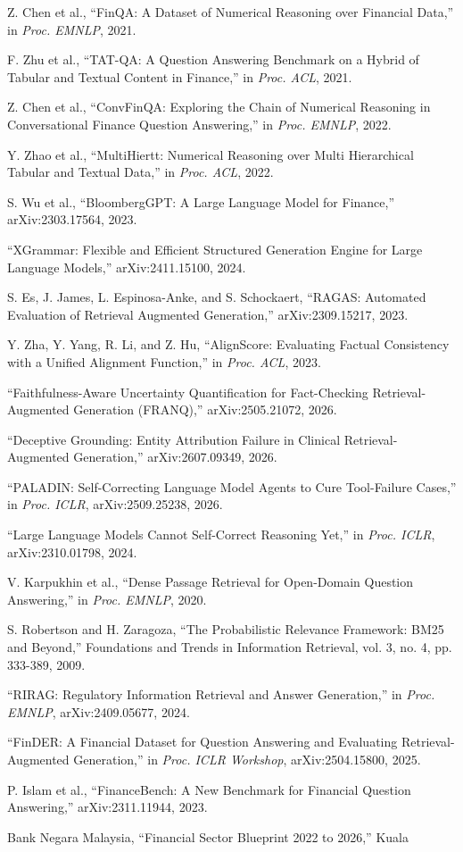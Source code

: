 \documentclass[11pt,a4paper]{article}
\newcommand{\refitem}[2]{%
  \par\noindent\hangindent=19pt\hangafter=1
  \makebox[19pt][l]{[#1]}#2\par}
\begin{document}
{\setlength{\parskip}{6pt}\fontsize{9.5}{12}\selectfont

\refitem{1}{Z. Chen et al., ``FinQA: A Dataset of Numerical Reasoning over Financial
Data,'' in \textit{Proc. EMNLP}, 2021.}
\refitem{2}{F. Zhu et al., ``TAT-QA: A Question Answering Benchmark on a Hybrid of
Tabular and Textual Content in Finance,'' in \textit{Proc. ACL}, 2021.}
\refitem{3}{Z. Chen et al., ``ConvFinQA: Exploring the Chain of Numerical Reasoning in
Conversational Finance Question Answering,'' in \textit{Proc. EMNLP}, 2022.}
\refitem{4}{Y. Zhao et al., ``MultiHiertt: Numerical Reasoning over Multi Hierarchical
Tabular and Textual Data,'' in \textit{Proc. ACL}, 2022.}
\refitem{5}{S. Wu et al., ``BloombergGPT: A Large Language Model for Finance,''
arXiv:2303.17564, 2023.}
\refitem{6}{``XGrammar: Flexible and Efficient Structured Generation Engine for Large
Language Models,'' arXiv:2411.15100, 2024.}
\refitem{7}{S. Es, J. James, L. Espinosa-Anke, and S. Schockaert, ``RAGAS: Automated
Evaluation of Retrieval Augmented Generation,'' arXiv:2309.15217, 2023.}
\refitem{8}{Y. Zha, Y. Yang, R. Li, and Z. Hu, ``AlignScore: Evaluating Factual
Consistency with a Unified Alignment Function,'' in \textit{Proc. ACL}, 2023.}
\refitem{9}{``Faithfulness-Aware Uncertainty Quantification for Fact-Checking
Retrieval-Augmented Generation (FRANQ),'' arXiv:2505.21072, 2026.}
\refitem{10}{``Deceptive Grounding: Entity Attribution Failure in Clinical
Retrieval-Augmented Generation,'' arXiv:2607.09349, 2026.}
\refitem{11}{``PALADIN: Self-Correcting Language Model Agents to Cure Tool-Failure
Cases,'' in \textit{Proc. ICLR}, arXiv:2509.25238, 2026.}
\refitem{12}{``Large Language Models Cannot Self-Correct Reasoning Yet,'' in
\textit{Proc. ICLR}, arXiv:2310.01798, 2024.}
\refitem{13}{V. Karpukhin et al., ``Dense Passage Retrieval for Open-Domain Question
Answering,'' in \textit{Proc. EMNLP}, 2020.}
\refitem{14}{S. Robertson and H. Zaragoza, ``The Probabilistic Relevance Framework: BM25
and Beyond,'' Foundations and Trends in Information Retrieval, vol. 3, no. 4,
pp. 333-389, 2009.}
\refitem{15}{``RIRAG: Regulatory Information Retrieval and Answer Generation,'' in
\textit{Proc. EMNLP}, arXiv:2409.05677, 2024.}
\refitem{16}{``FinDER: A Financial Dataset for Question Answering and Evaluating
Retrieval-Augmented Generation,'' in \textit{Proc. ICLR Workshop}, arXiv:2504.15800, 2025.}
\refitem{17}{P. Islam et al., ``FinanceBench: A New Benchmark for Financial Question
Answering,'' arXiv:2311.11944, 2023.}
\refitem{18}{Bank Negara Malaysia, ``Financial Sector Blueprint 2022 to 2026,'' Kuala
}}
\end{document}
